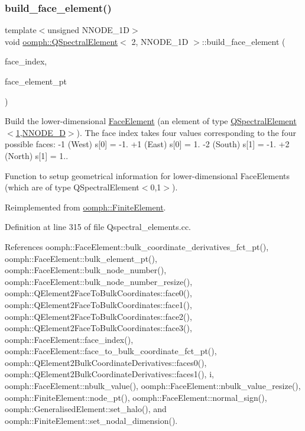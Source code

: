 \subsubsection{\texorpdfstring{build\+\_\+face\+\_\+element()}{build\_face\_element()}}
{\footnotesize\ttfamily template$<$unsigned N\+N\+O\+D\+E\+\_\+1D$>$ \\
void \hyperlink{classoomph_1_1QSpectralElement}{oomph\+::\+Q\+Spectral\+Element}$<$ 2, N\+N\+O\+D\+E\+\_\+1D $>$\+::build\+\_\+face\+\_\+element (\begin{DoxyParamCaption}\item[{const int \&}]{face\+\_\+index,  }\item[{\hyperlink{classoomph_1_1FaceElement}{Face\+Element} $\ast$}]{face\+\_\+element\+\_\+pt }\end{DoxyParamCaption})\hspace{0.3cm}{\ttfamily [virtual]}}



Build the lower-\/dimensional \hyperlink{classoomph_1_1FaceElement}{Face\+Element} (an element of type \hyperlink{classoomph_1_1QSpectralElement_3_011_00_01NNODE__1D_01_4}{Q\+Spectral\+Element$<$1,\+N\+N\+O\+D\+E\+\_\+D$>$}). The face index takes four values corresponding to the four possible faces\+: -\/1 (West) s\mbox{[}0\mbox{]} = -\/1. +1 (East) s\mbox{[}0\mbox{]} = 1. -\/2 (South) s\mbox{[}1\mbox{]} = -\/1. +2 (North) s\mbox{[}1\mbox{]} = 1.. 

Function to setup geometrical information for lower-\/dimensional Face\+Elements (which are of type Q\+Spectral\+Element$<$0,1$>$). 

Reimplemented from \hyperlink{classoomph_1_1FiniteElement_aaf7bead5b462cfd5401d97b3dbdc7af7}{oomph\+::\+Finite\+Element}.



Definition at line 315 of file Qspectral\+\_\+elements.\+cc.



References oomph\+::\+Face\+Element\+::bulk\+\_\+coordinate\+\_\+derivatives\+\_\+fct\+\_\+pt(), oomph\+::\+Face\+Element\+::bulk\+\_\+element\+\_\+pt(), oomph\+::\+Face\+Element\+::bulk\+\_\+node\+\_\+number(), oomph\+::\+Face\+Element\+::bulk\+\_\+node\+\_\+number\+\_\+resize(), oomph\+::\+Q\+Element2\+Face\+To\+Bulk\+Coordinates\+::face0(), oomph\+::\+Q\+Element2\+Face\+To\+Bulk\+Coordinates\+::face1(), oomph\+::\+Q\+Element2\+Face\+To\+Bulk\+Coordinates\+::face2(), oomph\+::\+Q\+Element2\+Face\+To\+Bulk\+Coordinates\+::face3(), oomph\+::\+Face\+Element\+::face\+\_\+index(), oomph\+::\+Face\+Element\+::face\+\_\+to\+\_\+bulk\+\_\+coordinate\+\_\+fct\+\_\+pt(), oomph\+::\+Q\+Element2\+Bulk\+Coordinate\+Derivatives\+::faces0(), oomph\+::\+Q\+Element2\+Bulk\+Coordinate\+Derivatives\+::faces1(), i, oomph\+::\+Face\+Element\+::nbulk\+\_\+value(), oomph\+::\+Face\+Element\+::nbulk\+\_\+value\+\_\+resize(), oomph\+::\+Finite\+Element\+::node\+\_\+pt(), oomph\+::\+Face\+Element\+::normal\+\_\+sign(), oomph\+::\+Generalised\+Element\+::set\+\_\+halo(), and oomph\+::\+Finite\+Element\+::set\+\_\+nodal\+\_\+dimension().

